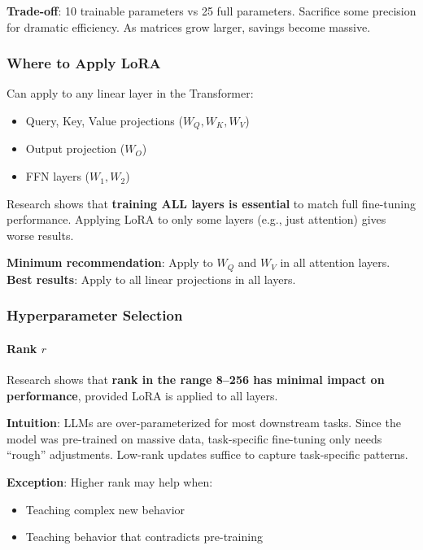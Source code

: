 \documentclass{article}
\begin{document}
\textbf{Trade-off}: 10 trainable parameters vs 25 full parameters. Sacrifice some precision for dramatic efficiency. As matrices grow larger, savings become massive.

\subsubsection{Where to Apply LoRA}

Can apply to any linear layer in the Transformer:
\begin{itemize}
\item Query, Key, Value projections ($W_Q, W_K, W_V$)
\item Output projection ($W_O$)
\item FFN layers ($W_1, W_2$)
\end{itemize}

\begin{tcolorbox}[colback=blue!5!white, colframe=blue!75!black, title=Critical Finding: Train All Layers]
Research shows that \textbf{training ALL layers is essential} to match full fine-tuning performance. Applying LoRA to only some layers (e.g., just attention) gives worse results.

\textbf{Minimum recommendation}: Apply to $W_Q$ and $W_V$ in all attention layers.\\
\textbf{Best results}: Apply to all linear projections in all layers.
\end{tcolorbox}

\subsubsection{Hyperparameter Selection}

\paragraph{Rank $r$}

\begin{tcolorbox}[colback=yellow!5!white, colframe=orange!50!black, title=Surprising Result About Rank]
Research shows that \textbf{rank in the range 8--256 has minimal impact on performance}, provided LoRA is applied to all layers.

\textbf{Intuition}: LLMs are over-parameterized for most downstream tasks. Since the model was pre-trained on massive data, task-specific fine-tuning only needs ``rough'' adjustments. Low-rank updates suffice to capture task-specific patterns.

\textbf{Exception}: Higher rank may help when:
\begin{itemize}
\item Teaching complex new behavior
\item Teaching behavior that contradicts pre-training
\end{itemize}
\end{tcolorbox}
\end{document}
